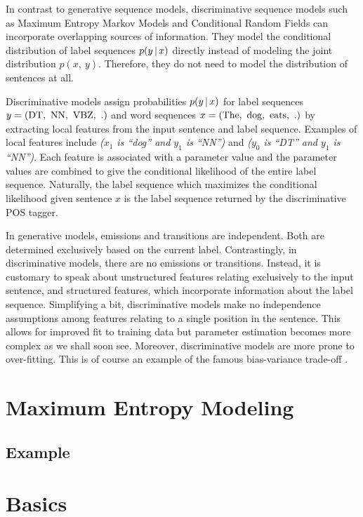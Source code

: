 In contrast to generative sequence models, discriminative sequence
models such as Maximum Entropy Markov Models \citep{Ratnaparkhi1998}
and Conditional Random Fields \citep{Lafferty2001} can incorporate
overlapping sources of information. They model the conditional
distribution of label sequences $p(y\mbox{$ \, | \, $} x)$ directly instead of
modeling the joint distribution $p(x,\ y)$. Therefore, they do not
need to model the distribution of sentences at all. 

Discriminative models assign probabilities $p(y\mbox{$ \, | \, $} x)$ for label
sequences $y = ({\rm DT},\ {\rm NN},\ {\rm VBZ},\ {\rm .})$ and word sequences $x = ({\rm The},\ {\rm dog},\ {\rm eats},\ {\rm .})$ by extracting local features from
the input sentence and label sequence. Examples of local features
include {\it ($x_1$ is ``dog'' and $y_1$ is ``NN'')} and {\it ($y_{0}$ is ``DT'' and
  $y_1$ is ``NN'')}. Each feature is associated with a parameter value and the
parameter values are combined to give the conditional likelihood of
the entire label sequence. Naturally, the label sequence which
maximizes the conditional likelihood given sentence $x$ is the label
sequence returned by the discriminative POS tagger.

In generative models, emissions and transitions are independent. Both
are determined exclusively based on the current label. Contrastingly,
in discriminative models, there are no emissions or
transitions. Instead, it is customary to speak about unstructured
features relating exclusively to the input sentence, and structured
features, which incorporate information about the label
sequence. Simplifying a bit, discriminative models make no
independence assumptions among features relating to a single position
in the sentence. This allows for improved fit to training data but
parameter estimation becomes more complex as we shall soon
see. Moreover, discriminative models are more prone to
over-fitting. This is of course an example of the famous bias-variance
trade-off \citep{Geman1992}.


\section{Maximum Entropy Modeling}
\label{sec:me}

\subsection{Example}
\label{sec:maxent-ex}

\section{Basics}
\label{crf:basics}

